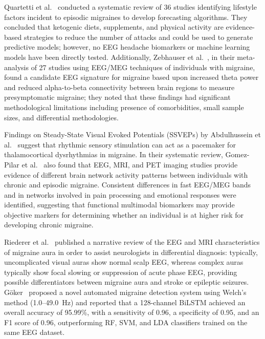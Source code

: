 \documentclass[12pt, a4paper]{report}
\begin{document}
Quartetti et al.~\cite{Quartetti2025} conducted a systematic review of 36 studies identifying lifestyle factors incident to episodic migraines to develop forecasting algorithms. They concluded that ketogenic diets, supplements, and physical activity are evidence-based strategies to reduce the number of attacks and could be used to generate predictive models; however, no EEG headache biomarkers or machine learning models have been directly tested. Additionally, Zebhauser et al.~\cite{Zebhauser2024}, in their meta-analysis of 27 studies using EEG/MEG techniques of individuals with migraine, found a candidate EEG signature for migraine based upon increased theta power and reduced alpha-to-beta connectivity between brain regions to measure presymptomatic migraine; they noted that these findings had significant methodological limitations including presence of comorbidities, small sample sizes, and differential methodologies.

Findings on Steady-State Visual Evoked Potentials (SSVEPs) by Abdulhussein et al.~\cite{AbdulhusseinAldeen2024} suggest that rhythmic sensory stimulation can act as a pacemaker for thalamocortical dysrhythmias in migraine. In their systematic review, Gomez-Pilar et al.~\cite{GomezPilar2022} also found that EEG, MRI, and PET imaging studies provide evidence of different brain network activity patterns between individuals with chronic and episodic migraine. Consistent differences in fast EEG/MEG bands and in networks involved in pain processing and emotional responses were identified, suggesting that functional multimodal biomarkers may provide objective markers for determining whether an individual is at higher risk for developing chronic migraine.

Riederer et al.~\cite{Riederer2023} published a narrative review of the EEG and MRI characteristics of migraine aura in order to assist neurologists in differential diagnosis: typically, uncomplicated visual auras show normal scalp EEG, whereas complex auras typically show focal slowing or suppression of acute phase EEG, providing possible differentiators between migraine aura and stroke or epileptic seizures. Göker~\cite{Goker2023} proposed a novel automated migraine detection system using Welch's method (1.0--49.0~Hz) and reported that a 128-channel BiLSTM achieved an overall accuracy of 95.99\%, with a sensitivity of 0.96, a specificity of 0.95, and an F1 score of 0.96, outperforming RF, SVM, and LDA classifiers trained on the same EEG dataset.
\end{document}
